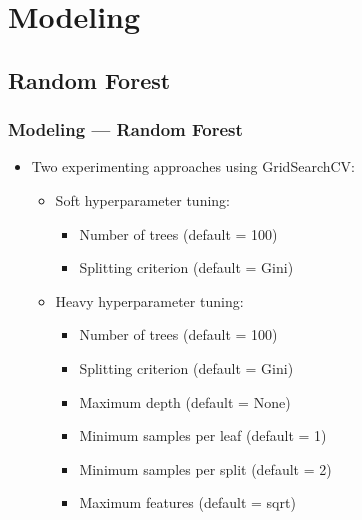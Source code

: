 \documentclass[10pt, aspectratio=169]{beamer}
\begin{document}
\section{Modeling}
\subsection{Random Forest}
\begin{frame}
    \frametitle{Modeling --- Random Forest}
    \begin{itemize}
        \item Two experimenting approaches using GridSearchCV:
        \begin{itemize}
            \item Soft hyperparameter tuning:
            \begin{itemize}
                \item Number of trees (default = 100)
                \item Splitting criterion (default = Gini)
            \end{itemize}
            \item Heavy hyperparameter tuning:
            \begin{itemize}
                \item Number of trees (default = 100)
                \item Splitting criterion (default = Gini)
                \item Maximum depth (default = None)
                \item Minimum samples per leaf (default = 1)
                \item Minimum samples per split (default = 2)
                \item Maximum features (default = sqrt)
            \end{itemize}
        \end{itemize}
    \end{itemize}
\end{frame}
\end{document}
